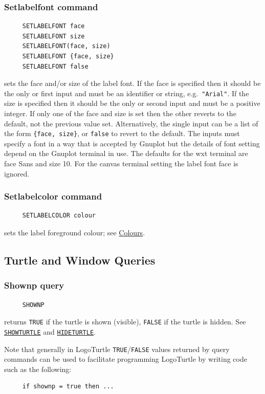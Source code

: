 \hypertarget{logoturtle:setlabelfont}{\subsubsection*{Setlabelfont command}}
\begin{verbatim}
     SETLABELFONT face
     SETLABELFONT size
     SETLABELFONT(face, size)
     SETLABELFONT {face, size}
     SETLABELFONT false
\end{verbatim}
sets the face and/or size of the label font.  If the face is specified
then it should be the only or first input and must be an identifier or
string, e.g.\ \texttt{"Arial"}.  If the size is specified then it
should be the only or second input and must be a positive integer.  If
only one of the face and size is set then the other reverts to the
default, not the previous value set.  Alternatively, the single input
can be a list of the form \texttt{\{face, size\}}, or \texttt{false}
to revert to the default.  The inputs must specify a font in a way
that is accepted by Gnuplot but the details of font setting depend on
the Gnuplot terminal in use.  The defaults for the wxt terminal are
face Sans and size 10.  For the canvas terminal setting the label font
face is ignored.

\subsubsection*{Setlabelcolor command}
\begin{verbatim}
     SETLABELCOLOR colour
\end{verbatim}
sets the label foreground colour; see
\hyperref[logoturtle:Colours]{Colours}.


\subsection{Turtle and Window Queries}

\subsubsection*{Shownp query}
\begin{verbatim}
     SHOWNP
\end{verbatim}
returns \texttt{TRUE} if the turtle is shown (visible), \texttt{FALSE}
if the turtle is hidden.  See
\hyperlink{logoturtle:showturtle}{\texttt{SHOWTURTLE}} and
\hyperlink{logoturtle:hideturtle}{\texttt{HIDETURTLE}}.

Note that generally in LogoTurtle \texttt{TRUE}/\texttt{FALSE} values
returned by query commands can be used to facilitate programming
LogoTurtle by writing code such as the following:
\begin{verbatim}
     if shownp = true then ...
\end{verbatim}

